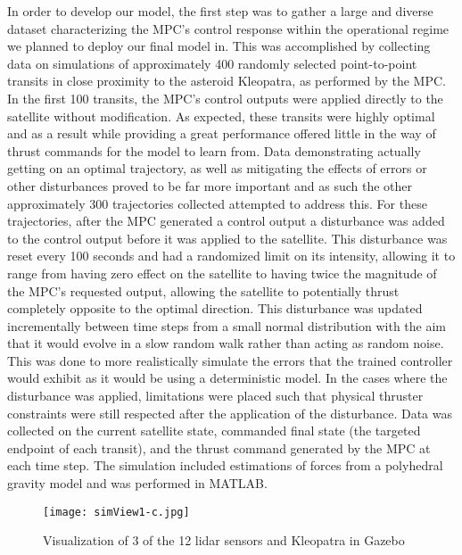 \documentclass[twocolumn,letterpaper]{IEEEAerospaceCLS}
\begin{document}
In order to develop our model, the first step was to gather a large and diverse dataset characterizing the MPC's control response within the operational regime we planned to deploy our final model in. This was accomplished by collecting data on simulations of approximately 400 randomly selected point-to-point transits in close proximity to the asteroid Kleopatra, as performed by the MPC. In the first 100 transits, the MPC's control outputs were applied directly to the satellite without modification. As expected, these transits were highly optimal and as a result while providing a great performance offered little in the way of thrust commands for the model to learn from. Data demonstrating actually getting on an optimal trajectory, as well as mitigating the effects of errors or other disturbances proved to be far more important and as such the other approximately 300 trajectories collected attempted to address this. For these trajectories, after the MPC generated a control output a disturbance was added to the control output before it was applied to the satellite.  This disturbance was reset every 100 seconds and had a randomized limit on its intensity, allowing it to range from having zero effect on the satellite to having twice the magnitude of the MPC's requested output, allowing the satellite to potentially thrust completely opposite to the optimal direction. This disturbance was updated incrementally between time steps from a small normal distribution with the aim that it would evolve in a slow random walk rather than acting as random noise. This was done to more realistically simulate the errors that the trained controller would exhibit as it would be using a deterministic model. In the cases where the disturbance was applied, limitations were placed such that physical thruster constraints were still respected after the application of the disturbance. Data was collected on the current satellite state, commanded final state (the targeted endpoint of each transit), and the thrust command generated by the MPC at each time step. The simulation included estimations of forces from a polyhedral gravity model and was performed in MATLAB.

\begin{figure}[ht]
    \centering
    \texttt{[image: simView1-c.jpg]}
    \caption{Visualization of 3 of the 12 lidar sensors and Kleopatra in Gazebo}
    \label{fig:SimScreenshot}
\end{figure}
\end{document}
